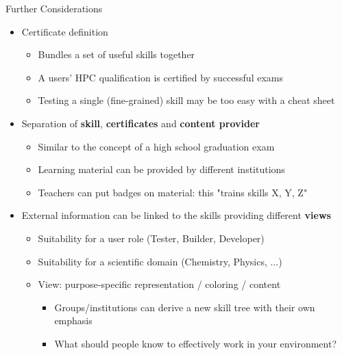 \documentclass[compress,aspectratio=169]{beamer}
\begin{document}
\begin{frame}{Further Considerations}
	\begin{itemize}
		\item Certificate definition
		\begin{itemize}
			\item Bundles a set of useful skills together %
			\item A users' HPC qualification is certified by successful exams
      \item Testing a single (fine-grained) skill may be too easy with a cheat sheet
		\end{itemize}
		\item Separation of \textbf{skill}, \textbf{certificates} and \textbf{content provider}
		\begin{itemize}
			\item Similar to the concept of a high school graduation exam %
			\item Learning material can be provided by different institutions
			\item Teachers can put badges on material: this "trains skills X, Y, Z"
		\end{itemize}
  	\item External information can be linked to the skills providing different \textbf{views}
		\begin{itemize}
			\item Suitability for a user role (Tester, Builder, Developer)
			\item Suitability for a scientific domain (Chemistry, Physics, ...)
			\item View: purpose-specific representation / coloring / content
				\begin{itemize}
				\item Groups/institutions can derive a new skill tree with their own emphasis
				\item  What should people know to effectively work in your environment?
				\end{itemize}
		\end{itemize}
	\end{itemize}
\end{frame}
\end{document}
